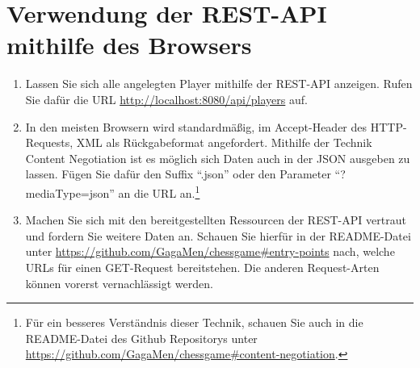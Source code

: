 \section{Verwendung der REST-API mithilfe des Browsers}
\begin{enumerate}
	\item Lassen Sie sich alle angelegten Player mithilfe der \gls{REST}-\gls{API} anzeigen. Rufen Sie dafür die \gls{URL} \url{http://localhost:8080/api/players} auf.
	\item In den meisten Browsern wird standardmäßig, im Accept-Header des \gls{HTTP}-Requests, \acrfull{XML} als Rückgabeformat angefordert. Mithilfe der Technik Content Negotiation ist es möglich sich Daten auch in der \acrfull{JSON} ausgeben zu lassen. Fügen Sie dafür den Suffix \enquote{.json} oder den Parameter \enquote{?mediaType=json} an die \gls{URL} an.\footnote{Für ein besseres Verständnis dieser Technik, schauen Sie auch in die README-Datei des Github Repositorys unter \url{https://github.com/GagaMen/chessgame\#content-negotiation}.}
	\item Machen Sie sich mit den bereitgestellten Ressourcen der \gls{REST}-\gls{API} vertraut und fordern Sie weitere Daten an. Schauen Sie hierfür in der README-Datei unter \url{https://github.com/GagaMen/chessgame\#entry-points} nach, welche \glspl{URL} für einen GET-Request bereitstehen. Die anderen Request-Arten können vorerst vernachlässigt werden.
\end{enumerate}

